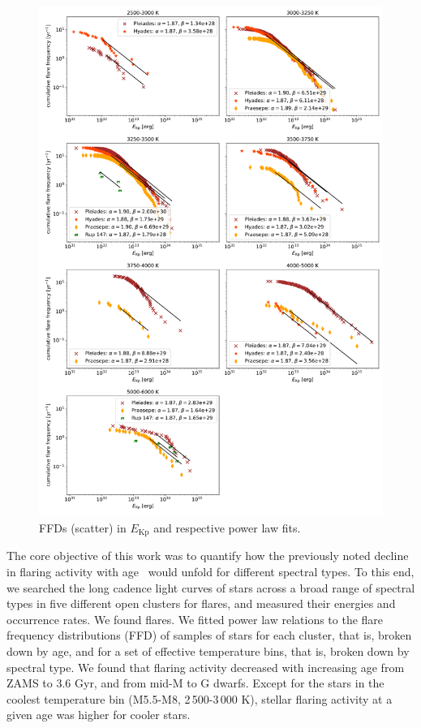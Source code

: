 \documentclass{aa}
\begin{document}
\begin{figure}
    \centering
    \includegraphics[width=16cm]{pics/FFDs/SpT_wise_sample_ffd_energy_wheatland.png}
    \caption{FFDs (scatter) in $E_\mathrm{Kp}$ and respective power law fits.}          	
    \label{fig:powerlawfits_erg}
\end{figure}
The core objective of this work was to quantify how the previously noted decline in flaring activity with age~\citep{hilton_dwarf_2010} would unfold for different spectral types. To this end, we searched the long cadence light curves of stars across a broad range of spectral types in five different open clusters for flares, and measured their energies and occurrence rates. We found  flares. We fitted power law relations to the flare frequency distributions (FFD) of samples of stars for each cluster, that is, broken down by age, and for a set of effective temperature bins, that is, broken down by spectral type. We found that flaring activity decreased with increasing age from ZAMS to 3.6 Gyr, and from mid-M to G dwarfs. Except for the stars in the coolest temperature bin (M5.5-M8, 2\,500-3\,000 K), stellar flaring activity at a given age was higher for cooler stars.
\end{document}
